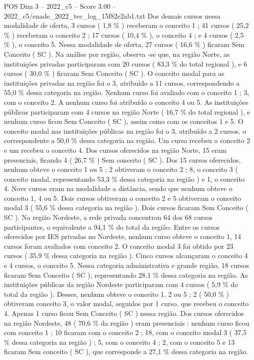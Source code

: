 \begin{textsample}{POS Dim 3 – 2022\_c5 – Score 3.00 – 2022\_c5/enade\_2022\_tec\_log\_15f82e2ab1.txt}
Dos demais cursos nessa modalidade de oferta, 3 cursos ( 1,8 \% ) receberam o conceito 1 ; 41 cursos ( 25,2 \% ) receberam o conceito 2 ; 17 cursos ( 10,4 \% ), o conceito 4 ; e 4 cursos ( 2,5 \% ), o conceito 5.
Nessa modalidade de oferta, 27 cursos ( 16,6 \% ) ficaram Sem Conceito ( SC ).
Na análise por região, observa -se que, na região Norte, as instituições privadas participaram com 20 cursos ( 83,3 \% do total regional ), e 6 cursos ( 30,0 \% ) ficaram Sem Conceito ( SC ).
O conceito modal para as instituições privadas na região foi o 3, atribuído a 11 cursos, correspondendo a 55,0 \% dessa categoria na região.
Nenhum curso foi avaliado com o conceito 1 ; 3, com o conceito 2.
A nenhum curso foi atribuído o conceito 4 ou 5.
As instituições públicas participaram com 4 cursos na região Norte ( 16,7 \% do total regional ), e nenhum curso ficou Sem Conceito ( SC ), assim como com os conceitos 1 e 5.
O conceito modal nas instituições públicas na região foi o 3, atribuído a 2 cursos, o correspondente a 50,0 \% dessa categoria na região.
Um curso recebeu o conceito 2 e um recebeu o conceito 4.
Dos cursos oferecidos na região Norte, 15 eram presenciais, ficando 4 ( 26,7 \% ) Sem conceito ( SC ).
Dos 15 cursos oferecidos, nenhum obteve o conceito 1 ou 5 ; 2 obtiveram o conceito 2 ; 8, o conceito 3 ( conceito modal, representando 53,3 \% dessa categoria na região ) e 1, o conceito 4.
Nove cursos eram na modalidade a distância, sendo que nenhum obteve o conceito 1, 4 ou 5.
Dois cursos obtiveram o conceito 2 e 5 obtiveram o conceito modal 3 ( 55,6 \% dessa categoria na região ).
Dois cursos ficaram Sem Conceito ( SC ).
Na região Nordeste, a rede privada concentrou 64 dos 68 cursos participantes, o equivalente a 94,1 \% do total da região.
Entre os cursos oferecidos por IES privadas no Nordeste, nenhum curso obteve o conceito 1, 14 cursos foram avaliados com conceito 2.
O conceito modal 3 foi obtido por 23 cursos ( 35,9 \% dessa categoria na região ).
Cinco cursos alcançaram o conceito 4 e 4 cursos, o conceito 5.
Nessa categoria administrativa e grande região, 18 cursos ficaram Sem Conceito ( SC ), representando 28,1 \% dessa categoria na região.
As instituições públicas da região Nordeste participaram com 4 cursos ( 5,9 \% do total da região ).
Desses, nenhum obteve o conceito 1, 2 ou 5 ; 2 ( 50,0 \% ) obtiveram conceito 3, o valor modal, seguidos por 1 curso, que recebeu o conceito 4.
Apenas 1 curso ficou Sem Conceito ( SC ) nessa região.
Dos cursos oferecidos na região Nordeste, 48 ( 70,6 \% da região ) eram presenciais : nenhum curso ficou com conceito 1 ; 10 ficaram com o conceito 2 ; 18, com o conceito modal 3 ( 37,5 \% dessa categoria na região ) ; 5, com o conceito 4 ; 2, com o conceito 5 e 13 ficaram Sem conceito ( SC ), que corresponde a 27,1 \% dessa categoria na região.

\end{textsample}
